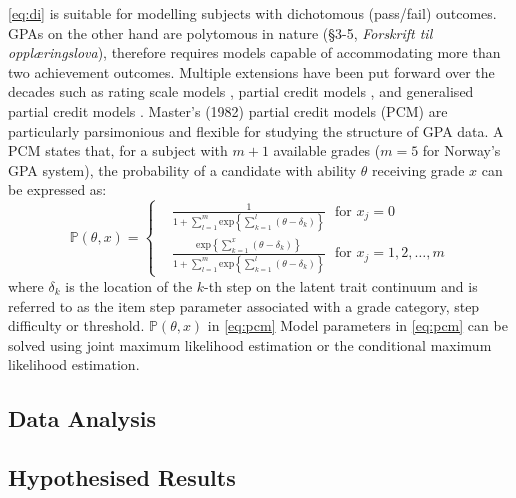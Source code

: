 \documentclass[
    a4paper,            %
    11pt,               %
    stu,                %
    donotrepeattitle,   %
    noextraspace,       %
    floatsintext,       %
    biblatex,           %
    colorlinks=true,        %
    linkcolor=red,          %
    anchorcolor=black,      %
    citecolor=blue,         %
    urlcolor=blue,          %
    bookmarks=true,         %
    bookmarksopen=false,    %
    bookmarksnumbered=true  %
]{apa7}
\newcommand{\p}[1]{\mathbb{P}\left(#1\right)}
\renewcommand{\exp}[1]{\mathrm{exp}\left\{#1\right\}}
\begin{document}
\cref{eq:di} is suitable for modelling subjects with dichotomous (pass/fail) outcomes. GPAs on the other hand are polytomous in nature (\S 3-5, \textit{Forskrift til oppl{\ae}ringslova}), therefore requires models capable of accommodating more than two achievement outcomes. Multiple extensions have been put forward over the decades such as rating scale models \parencite{rasch:1980}, partial credit models \parencite{masters:1982}, and generalised partial credit models \parencite{muraki:1992}. Master's (1982) partial credit models (PCM) are particularly parsimonious and flexible for studying the structure of GPA data. A PCM states that, for a subject with $m+1$ available grades ($m=5$ for Norway's GPA system), the probability of a candidate with ability $\theta$ receiving grade $x$ can be expressed as:
\begin{equation}\label{eq:pcm}
    \p{\theta, x}=
    \left\{
        \begin{aligned}
            &\frac{1}{1 + \sum_{l=1}^m \exp{ \sum_{k=1}^l (\theta - \delta_k) }}\ \ \ \text{for } x_j = 0\\
            &\frac{ \exp{ \sum_{k=1}^x (\theta - \delta_k) } }{1 + \sum_{l=1}^m \exp{ \sum_{k=1}^l (\theta - \delta_k) }}\ \ \ \text{for } x_j = 1,2,\dots,m
        \end{aligned}
    \right.
\end{equation}
where $\delta_k$ is the location of the $k$-th step on the latent trait continuum and is referred to as the item step parameter associated with a grade category, step difficulty or threshold. $\p{\theta, x}$ in \cref{eq:pcm} Model parameters in \cref{eq:pcm} can be solved using joint maximum likelihood estimation or the conditional maximum likelihood estimation.




\subsection{Data Analysis}


\subsection{Hypothesised Results}











\printbibliography
\end{document}
